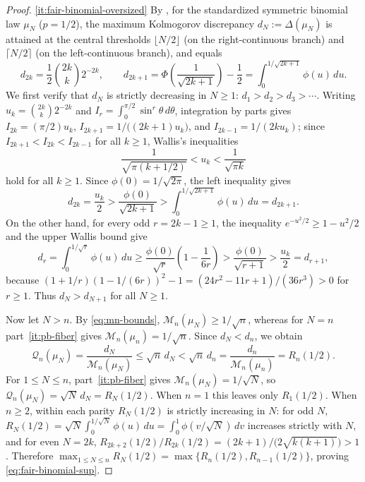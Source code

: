 \documentclass[11pt]{article}
\numberwithin{equation}{section}
\theoremstyle{definition}
\theoremstyle{remark}
\newcommand{\phz}{\phi(0)}
\begin{document}
\begin{proof}
\ref{it:fair-binomial-oversized} By \citet[Theorem~1.3(a)]{MattnerSchulz2018},
for the standardized symmetric binomial law $\mu_N$ ($p=1/2$), the maximum
Kolmogorov discrepancy $d_N:=\Delta(\mu_N)$ is attained at the central
thresholds $\lfloor N/2\rfloor$ (on the right-continuous branch) and
$\lceil N/2\rceil$ (on the left-continuous branch), and equals
\begin{equation}\label{eq:dn-exact}
 d_{2k}=\frac12\binom{2k}{k}2^{-2k},\qquad
 d_{2k+1}=\Phi\!\left(\frac{1}{\sqrt{2k+1}}\right)-\frac12
 =\int_0^{1/\sqrt{2k+1}}\phi(u)\,du.
\end{equation}
We first verify that $d_N$ is strictly decreasing in $N\ge1$:
$d_1>d_2>d_3>\cdots$. Writing $u_k=\binom{2k}{k}2^{-2k}$ and
$I_r=\int_0^{\pi/2}\sin^r\theta\,d\theta$, integration by parts gives
$I_{2k}=(\pi/2)u_k$, $I_{2k+1}=1/\bigl((2k+1)u_k\bigr)$, and
$I_{2k-1}=1/(2ku_k)$; since $I_{2k+1}<I_{2k}<I_{2k-1}$ for all $k\ge1$,
Wallis's inequalities
\[
 \frac{1}{\sqrt{\pi(k+1/2)}}<u_k<\frac{1}{\sqrt{\pi k}}
\]
hold for all $k\ge1$. Since $\phz=1/\sqrt{2\pi}$, the left inequality gives
\[
 d_{2k}=\frac{u_k}{2}>\frac{\phz}{\sqrt{2k+1}}
 >\int_0^{1/\sqrt{2k+1}}\phi(u)\,du=d_{2k+1}.
\]
On the other hand, for every odd $r=2k-1\ge1$, the inequality
$e^{-u^2/2}\ge 1-u^2/2$ and the upper Wallis bound give
\[
 d_r=\int_0^{1/\sqrt r}\phi(u)\,du
 \ge\frac{\phz}{\sqrt r}\left(1-\frac{1}{6r}\right)
 >\frac{\phz}{\sqrt{r+1}}>\frac{u_k}{2}=d_{r+1},
\]
because $(1+1/r)(1-1/(6r))^2-1=(24r^2-11r+1)/(36r^3)>0$ for $r\ge1$. Thus
$d_N>d_{N+1}$ for all $N\ge1$.

Now let $N>n$. By \eqref{eq:mn-bounds}, $\mathcal M_n(\mu_N)\ge 1/\sqrt n$,
whereas for $N=n$ part~\ref{it:pb-fiber} gives $\mathcal M_n(\mu_n)=1/\sqrt n$.
Since $d_N<d_n$, we obtain
\[
 \mathcal Q_n(\mu_N)=\frac{d_N}{\mathcal M_n(\mu_N)}
 \le\sqrt n\,d_N<\sqrt n\,d_n=\frac{d_n}{\mathcal M_n(\mu_n)}=R_n(1/2).
\]
For $1\le N\le n$, part~\ref{it:pb-fiber} gives $\mathcal M_n(\mu_N)=1/\sqrt N$,
so $\mathcal Q_n(\mu_N)=\sqrt N\,d_N=R_N(1/2)$. When $n=1$ this leaves only
$R_1(1/2)$. When $n\ge2$, within each parity $R_N(1/2)$ is strictly
increasing in $N$: for odd $N$,
$R_N(1/2)=\sqrt N\int_0^{1/\sqrt N}\phi(u)\,du=\int_0^1\phi(v/\sqrt N)\,dv$
increases strictly with $N$, and for even $N=2k$,
$R_{2k+2}(1/2)/R_{2k}(1/2)=(2k+1)/\bigl(2\sqrt{k(k+1)}\bigr)>1$. Therefore
$\max_{1\le N\le n}R_N(1/2)=\max\{R_n(1/2),R_{n-1}(1/2)\}$, proving
\eqref{eq:fair-binomial-sup}.
\end{proof}
\end{document}
